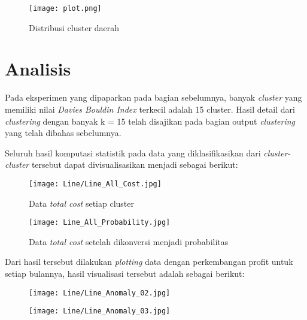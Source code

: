 \documentclass{article}
\begin{document}
\begin{figure}[H]
	\texttt{[image: plot.png]}
	\caption{Distribusi cluster daerah}
\end{figure}

\section{Analisis}

Pada eksperimen yang dipaparkan pada bagian sebelumnya, banyak \textit{cluster} yang memiliki nilai\textit{ Davies Bouldin Index} terkecil adalah 15 cluster. Hasil detail dari \textit{clustering} dengan banyak k = 15 telah disajikan pada bagian output \textit{clustering} yang telah dibahas sebelumnya.

Seluruh hasil komputasi statistik pada data yang diklasifikasikan dari \textit{cluster-cluster} tersebut dapat divisualisasikan menjadi sebagai berikut:

\begin{figure}[H]
	\centering
	\texttt{[image: Line/Line\_All\_Cost.jpg]}
	\caption{Data\textit{ total cost} setiap cluster}
\end{figure}

\begin{figure}[H]
	\centering
	\texttt{[image: Line\_All\_Probability.jpg]}
	\caption{Data \textit{total cost} setelah dikonversi menjadi probabilitas}
\end{figure}

Dari hasil tersebut dilakukan \textit{plotting} data dengan perkembangan profit untuk setiap bulannya, hasil visualisasi tersebut adalah sebagai berikut:

\begin{figure}[H]
	\centering
	\begin{minipage}{.5\textwidth}
		\centering
		\texttt{[image: Line/Line\_Anomaly\_02.jpg]}
	\end{minipage}%
	\begin{minipage}{.5\textwidth}
		\centering
		\texttt{[image: Line/Line\_Anomaly\_03.jpg]}
	\end{minipage}%
\end{figure}
\end{document}
